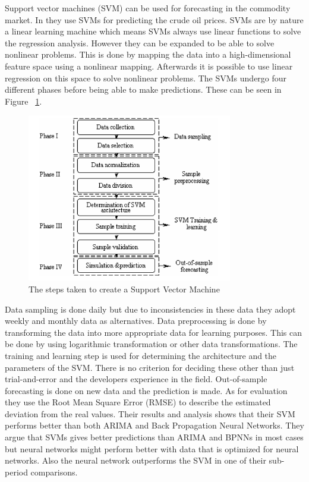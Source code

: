 Support vector machines (SVM) can be used for forecasting in the commodity market. In \cite{xie2006new} they use SVMs for predicting the crude oil prices. SVMs are by nature a linear learning machine which means SVMs always use linear functions to solve the regression analysis. However they can be expanded to be able to solve nonlinear problems. This is done by mapping the data into a high-dimensional feature space using a nonlinear mapping. Afterwards it is possible to use linear regression on this space to solve nonlinear problems. The SVMs undergo four different phases before being able to make predictions. These can be seen in Figure ~\ref{fig:phasesOfSVM}.
\begin{figure}[weight!]
\centering
\includegraphics[width=0.8\textwidth ,natwidth=410,natheight=237]{billeder/phases_of_SVM.png}
\caption{The steps taken to create a Support Vector Machine}
\label{fig:phasesOfSVM}
\end{figure}
Data sampling is done daily but due to inconsistencies in these data they adopt weekly and monthly data as alternatives. Data preprocessing is done by transforming the data into more appropriate data for learning purposes. This can be done by using logarithmic transformation or other data transformations. The training and learning step is used for determining the architecture and the parameters of the SVM. There is no criterion for deciding these other than just trial-and-error and the developers experience in the field. Out-of-sample forecasting is done on new data and the prediction is made. As for evaluation they use the Root Mean Square Error (RMSE) to describe the estimated deviation from the real values. Their results and analysis shows that their SVM performs better than both ARIMA and Back Propagation Neural Networks. They argue that SVMs gives better predictions than ARIMA and BPNNs in most cases but neural networks might perform better with data that is optimized for neural networks. Also the neural network outperforms the SVM in one of their sub-period comparisons.

